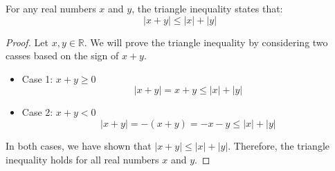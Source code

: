 \begin{definition}
    For any real numbers \( x \) and \( y \), the triangle inequality states that:
    \[ |x + y| \leq |x| + |y| \]
\end{definition}
\begin{proof}
    Let \( x, y \in \mathbb{R} \). We will prove the triangle inequality by considering two casses based on the sign of \( x + y \).
    \begin{itemize}[itemsep=1pt,label=$\circ$]
        \item Case 1: \( x + y \geq 0 \)
        \[ |x + y| = x + y \leq |x| + |y| \]
        \item Case 2: \( x + y < 0 \)
        \[ |x + y| = -(x + y) = -x - y \leq |x| + |y| \]
    \end{itemize}
    In both cases, we have shown that \( |x + y| \leq |x| + |y| \). Therefore, the triangle inequality holds for all real numbers \( x \) and \( y \).
\end{proof}

